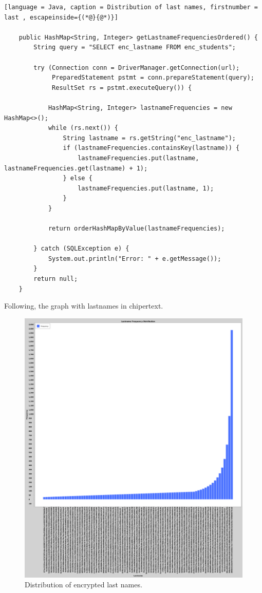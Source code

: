 \begin{lstlisting}[language = Java, caption = Distribution of last names, firstnumber = last , escapeinside={(*@}{@*)}]

    public HashMap<String, Integer> getLastnameFrequenciesOrdered() {
        String query = "SELECT enc_lastname FROM enc_students";

        try (Connection conn = DriverManager.getConnection(url);
             PreparedStatement pstmt = conn.prepareStatement(query);
             ResultSet rs = pstmt.executeQuery()) {

            HashMap<String, Integer> lastnameFrequencies = new HashMap<>();
            while (rs.next()) {
                String lastname = rs.getString("enc_lastname");
                if (lastnameFrequencies.containsKey(lastname)) {
                    lastnameFrequencies.put(lastname, lastnameFrequencies.get(lastname) + 1);
                } else {
                    lastnameFrequencies.put(lastname, 1);
                }
            }
            
            return orderHashMapByValue(lastnameFrequencies);

        } catch (SQLException e) {
            System.out.println("Error: " + e.getMessage());
        }
        return null;
    }
\end{lstlisting}

Following, the graph with lastnames in chipertext.

\begin{figure}[H]
    \centering
    \includegraphics[width=\textwidth]{03-ex2/Lastname_Frequency_Distribution.png}
    \caption{Distribution of encrypted last names.}
    \label{fig:Distribution-of-last-names}
\end{figure}

